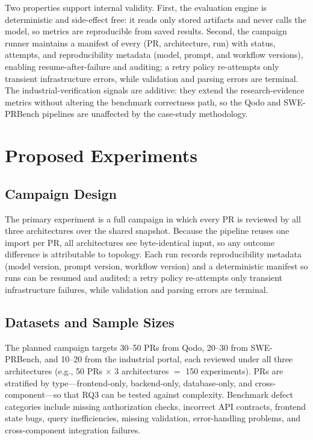 \documentclass[conference]{IEEEtran}
\begin{document}
Two properties support internal validity. First, the evaluation engine is
deterministic and side-effect free: it reads only stored artifacts and never calls
the model, so metrics are reproducible from saved results. Second, the campaign
runner maintains a manifest of every (PR, architecture, run) with status,
attempts, and reproducibility metadata (model, prompt, and workflow versions),
enabling resume-after-failure and auditing; a retry policy re-attempts only
transient infrastructure errors, while validation and parsing errors are terminal.
The industrial-verification signals are additive: they extend the research-evidence
metrics without altering the benchmark correctness path, so the Qodo and
SWE-PRBench pipelines are unaffected by the case-study methodology.

\section{Proposed Experiments}
\subsection{Campaign Design}
The primary experiment is a full campaign in which every PR is reviewed by all
three architectures over the shared snapshot. Because the pipeline reuses one
import per PR, all architectures see byte-identical input, so any outcome
difference is attributable to topology. Each run records reproducibility metadata
(model version, prompt version, workflow version) and a deterministic manifest so
runs can be resumed and audited; a retry policy re-attempts only transient
infrastructure failures, while validation and parsing errors are terminal.

\subsection{Datasets and Sample Sizes}
The planned campaign targets 30--50 PRs from Qodo, 20--30 from SWE-PRBench, and
10--20 from the industrial portal, each reviewed under all three architectures
(e.g., 50 PRs $\times$ 3 architectures $=$ 150 experiments). PRs are stratified by
type---frontend-only, backend-only, database-only, and cross-component---so that
RQ3 can be tested against complexity. Benchmark defect categories include missing
authorization checks, incorrect API contracts, frontend state bugs, query
inefficiencies, missing validation, error-handling problems, and cross-component
integration failures.
\end{document}
